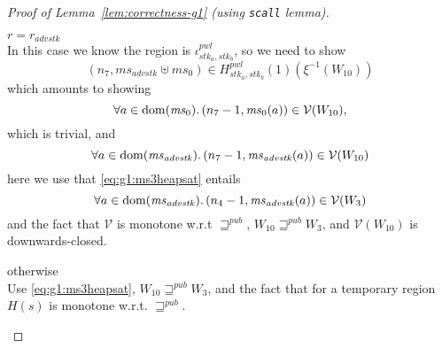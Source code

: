 \documentclass[a4paper]{article}
\DeclareMathOperator{\dom}{dom}
\newcommand{\var}[1]{\mathit{#1}}
\newcommand{\hs}{\var{ms}}
\newcommand{\ms}{\hs}
\newcommand{\adv}{\var{adv}}
\newcommand{\stk}{\var{stk}}
\newcommand{\pwl}{\var{pwl}}
\newcommand{\futurewk}{\mathbin{\sqsupseteq}^{\var{pub}}}
\newcommand{\asmType}{\plaindom{AsmType}}
\newcommand{\plaindom}[1]{\mathrm{#1}}
\newcommand{\intr}[2]{\mathcal{#1}}
\newcommand{\valueintr}[1]{\intr{V}{#1}}
\newcommand{\stdvr}{\valueintr{\asmType}}
\newcommand{\npair}[2][n]{\left(#1,#2 \right)}
\begin{document}
\begin{proof}[Proof of Lemma~\ref{lem:correctness-g1} (using \texttt{scall} lemma)]
\begin{enumproof}[resume]
\begin{enumproof}
\begin{enumproof}
\begin{enumproof}
                \item $r = r_{\adv \stk}$ \\
                  In this case we know the region is $\iota^\pwl_{\stk_a,\stk_b}$, so we need to show
                  \[
                    \npair[n_7]{\ms_{\adv \stk} \uplus \ms_0} \in H^\pwl_{\stk_a,\stk_b}(1)(\xi^{-1}(W_{10}))
                  \]
                  which amounts to showing
                  \[
                    \forall a \in \dom(\ms_0) \ldotp  \npair[n_7-1]{\ms_0(a)} \in \stdvr(W_{10}),
                  \]
                  which is trivial, and
                  \[
                    \forall a \in \dom(\ms_{\adv \stk}) \ldotp \npair[n_7-1]{\ms_{\adv \stk}(a)} \in \stdvr(W_{10})
                  \]
                  here we use that \ref{eq:g1:ms3heapsat} entails
                  \[
                    \forall a \in \dom(\ms_{\adv \stk}) \ldotp \npair[n_4-1]{\ms_{\adv \stk}(a)} \in \stdvr(W_3)
                  \]
                  and the fact that $\stdvr$ is monotone w.r.t $\futurewk$, $W_{10} \futurewk W_3$, and $\stdvr(W_{10})$ is downwards-closed.
                \item otherwise \\
                  Use \ref{eq:g1:ms3heapsat}, $W_{10} \futurewk W_3$, and the fact that for a temporary region $H(s)$ is monotone w.r.t. $\futurewk$.
              \end{enumproof}
              

\end{enumproof}
\end{enumproof}
\end{enumproof}
\end{proof}
\end{document}
